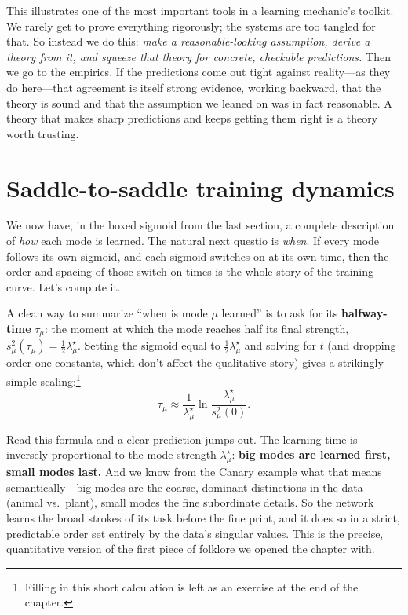 This illustrates one of the most important tools
in a learning mechanic's toolkit. We rarely get to
prove everything rigorously; the systems are too tangled for that. So instead we
do this: \emph{make a reasonable-looking assumption, derive a theory from it, and
squeeze that theory for concrete, checkable predictions.} Then we go to the
empirics. If the predictions come out tight against reality---as they do here---that
agreement is itself strong evidence, working backward, that the theory is sound
and that the assumption we leaned on was in fact reasonable. A theory that makes sharp predictions and keeps getting them right is a theory
worth trusting.

\section{Saddle-to-saddle training dynamics}

We now have, in the boxed sigmoid from the last section, a complete description of
\emph{how} each mode is learned. The natural next questio is \emph{when}.
If every mode follows its own sigmoid, and each sigmoid switches on at its own
time, then the order and spacing of those switch-on times is the whole story of
the training curve. Let's compute it.

A clean way to summarize ``when is mode $\mu$ learned'' is to ask for its
\textbf{halfway-time} $\tau_\mu$: the moment at which the mode reaches half its
final strength, $s^2_\mu(\tau_\mu) = \tfrac{1}{2}\lambda^\star_\mu$. Setting the
sigmoid equal to $\tfrac12\lambda^\star_\mu$ and solving for $t$ (and dropping
order-one constants, which don't affect the qualitative story) gives a strikingly
simple scaling:\footnote{Filling in this short calculation is left as an exercise
at the end of the chapter.}
\begin{equation}
    \tau_\mu \approx \frac{1}{\lambda^\star_\mu} \ln \frac{\lambda^\star_\mu}{s^2_\mu(0)}.
\end{equation}

Read this formula and a clear prediction jumps out. The learning time is inversely
proportional to the mode strength $\lambda^\star_\mu$: \textbf{big modes are
learned first, small modes last.} And we know from the Canary example what that
means semantically---big modes are the coarse, dominant distinctions in the data
(animal vs.\ plant), small modes the fine subordinate details. So the network
learns the broad strokes of its task before the fine print, and it does so in a
strict, predictable order set entirely by the data's singular values. This is the
precise, quantitative version of the first piece of folklore we opened the chapter
with.

